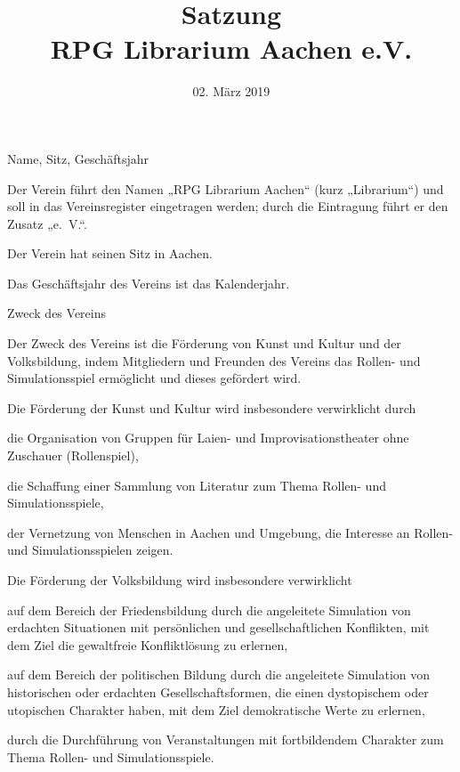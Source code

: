 \documentclass[11pt,a4paper,twoside,openany,article]{memoir}
\title{ Satzung \\ RPG Librarium Aachen e.V.}
\date{02. März 2019}
\begin{document}
	\maketitle
	\sloppy
\begin{para}{Name, Sitz, Geschäftsjahr}
	\label{p:name}
	\item Der Verein führt den Namen „RPG Librarium Aachen“ (kurz „Librarium“) und soll in das Vereinsregister eingetragen werden; durch die Eintragung führt er den Zusatz „e.~V.“.
	\item Der Verein hat seinen Sitz in Aachen.
	\item Das Geschäftsjahr des Vereins ist das Kalenderjahr.
\end{para}

\begin{para}{Zweck des Vereins}
	\label{p:zweck}
	\item Der Zweck des Vereins ist die Förderung von Kunst und Kultur und der Volksbildung, indem Mitgliedern und Freunden des Vereins das Rollen- und Simulationsspiel ermöglicht und dieses gefördert wird.
	\item Die Förderung der Kunst und Kultur wird insbesondere verwirklicht durch
	\begin{subpara}
		\item die Organisation von Gruppen für Laien- und Improvisationstheater ohne Zuschauer (Rollenspiel),
		\item die Schaffung einer Sammlung von Literatur zum Thema Rollen- und Simulationsspiele,
		\item der Vernetzung von Menschen in Aachen und Umgebung, die Interesse an Rollen- und Simulationsspielen zeigen.
	\end{subpara}
	\item Die Förderung der Volksbildung wird insbesondere verwirklicht
	\begin{subpara}
		\item auf dem Bereich der Friedensbildung durch die angeleitete Simulation von erdachten Situationen mit persönlichen und gesellschaftlichen Konflikten, mit dem Ziel die gewaltfreie Konfliktlösung zu erlernen,
		\item auf dem Bereich der politischen Bildung durch die angeleitete Simulation von historischen oder erdachten Gesellschaftsformen, die einen dystopischem oder utopischen Charakter haben, mit dem Ziel demokratische Werte zu erlernen,
		\item durch die Durchführung von Veranstaltungen mit fortbildendem Charakter zum Thema Rollen- und Simulationsspiele.
	\end{subpara}
\end{para}
\end{document}
